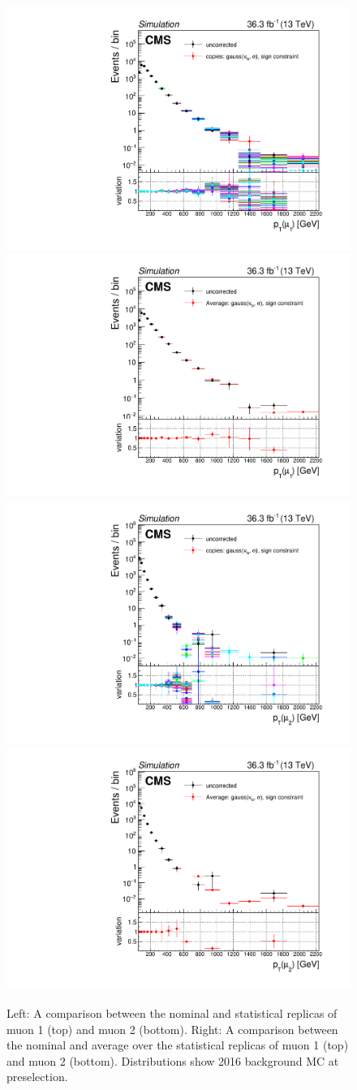 \begin{figure}[H]
    \centering
    {\includegraphics[width=.49\textwidth]{Images/Analysis/GEScaleSystStudy/StudyPlots_2016/Background/Copies/preSel/GEScaleSystStudyPlot_2016_Background_Copies_preSel_Pt_muon1.pdf}}
    {\includegraphics[width=.49\textwidth]{Images/Analysis/GEScaleSystStudy/StudyPlots_2016/Background/Averages/preSel/GEScaleSystStudyPlot_2016_Background_Average_preSel_Pt_muon1.pdf}}
    {\includegraphics[width=.49\textwidth]{Images/Analysis/GEScaleSystStudy/StudyPlots_2016/Background/Copies/preSel/GEScaleSystStudyPlot_2016_Background_Copies_preSel_Pt_muon2.pdf}}
    {\includegraphics[width=.49\textwidth]{Images/Analysis/GEScaleSystStudy/StudyPlots_2016/Background/Averages/preSel/GEScaleSystStudyPlot_2016_Background_Average_preSel_Pt_muon2.pdf}}
    \caption{Left: A comparison between the nominal and statistical replicas of muon 1 \pt (top) and muon 2 \pt (bottom). Right: A comparison between the nominal and average over the statistical replicas of muon 1 \pt (top) and muon 2 \pt (bottom). Distributions show 2016 background MC at preselection.}
    \label{figapp:gesysmuonptBkg}
\end{figure}

